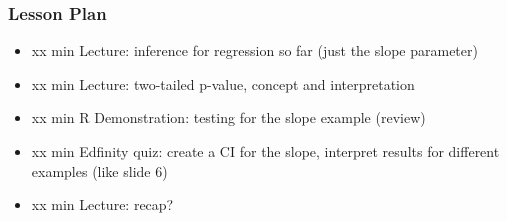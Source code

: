 \begin{frame}
    \frametitle{Lesson Plan}
    \begin{itemize}
        \item xx min Lecture: inference for regression so far (just the slope parameter)
        \item xx min Lecture: two-tailed p-value, concept and interpretation
        \item xx min R Demonstration: testing for the slope example (review)
        \item xx min Edfinity quiz: create a CI for the slope, interpret results for different examples (like slide 6)
        \item xx min Lecture: recap?
    \end{itemize}
\end{frame}

